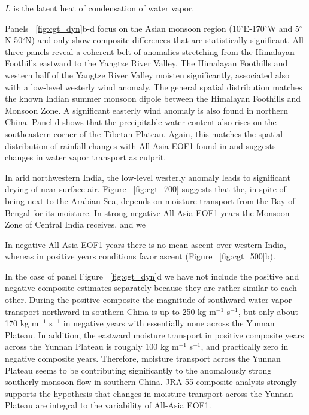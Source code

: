 	$L$ is the latent heat of condensation of water vapor.
	
	Panels ~\ref{fig:cgt_dyn}b-d focus on the Asian monsoon region (10$^{\circ}$E-170$^{\circ}$W and 5$^{\circ}$N-50$^{\circ}$N) and only show composite differences that are statistically significant. All three panels reveal a coherent belt of anomalies stretching from the Himalayan Foothills eastward to the Yangtze River Valley. The Himalayan Foothills and western half of the Yangtze River Valley moisten significantly, associated also with a low-level westerly wind anomaly. The general spatial distribution matches the known Indian summer monsoon dipole between the Himalayan Foothills and Monsoon Zone. A significant easterly wind anomaly is also found in northern China. Panel d shows that the precipitable water content also rises on the southeastern corner of the Tibetan Plateau. Again, this matches the spatial distribution of rainfall changes with All-Asia EOF1 found in \citet{Day2015} and suggests changes in water vapor transport as culprit.
	
	In arid northwestern India, the low-level westerly anomaly leads to significant drying of near-surface air. Figure ~\ref{fig:cgt_700} suggests that the, in spite of being next to the Arabian Sea, depends on moisture transport from the Bay of Bengal for its moisture. In strong negative All-Asia EOF1 years the Monsoon Zone of Central India receives, and we
	
	In negative All-Asia EOF1 years there is no mean ascent over western India, whereas in positive years conditions favor ascent (Figure  ~\ref{fig:cgt_500}b).
	
	In the case of panel Figure ~\ref{fig:cgt_dyn}d we have not include the positive and negative composite estimates separately because they are rather similar to each other. During the positive composite the magnitude of southward water vapor transport northward in southern China is up to 250 kg m$^{-1}$ s$^{-1}$, but only about 170 kg m$^{-1}$ s$^{-1}$ in negative years with essentially none across the Yunnan Plateau.  In addition, the eastward moisture transport in positive composite years across the Yunnan Plateau is roughly 100 kg m$^{-1}$ s$^{-1}$, and practically zero in negative composite years. Therefore, moisture transport across the Yunnan Plateau seems to be contributing significantly to the anomalously strong southerly monsoon flow in southern China. JRA-55 composite analysis strongly supports the hypothesis that changes in moisture transport across the Yunnan Plateau are integral to the variability of All-Asia EOF1.
						
